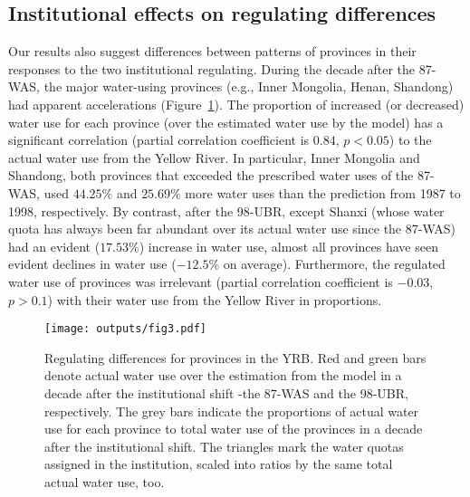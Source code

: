 \subsection{Institutional effects on regulating differences}
\label{result-3}
Our results also suggest differences between patterns of provinces in their responses to the two institutional regulating.
During the decade after the 87-WAS, the major water-using provinces (e.g., Inner Mongolia, Henan, Shandong) had apparent accelerations (Figure~\ref{regulating}).
The proportion of increased (or decreased) water use for each province (over the estimated water use by the model) has a significant correlation (partial correlation coefficient is $0.84$, $p<0.05$) to the actual water use from the Yellow River.
In particular, Inner Mongolia and Shandong, both provinces that exceeded the prescribed water uses of the 87-WAS, used $44.25\%$ and $25.69\%$ more water uses than the prediction from 1987 to 1998, respectively.
By contrast, after the 98-UBR, except Shanxi (whose water quota has always been far abundant over its actual water use since the 87-WAS) had an evident ($17.53\%$) increase in water use, almost all provinces have seen evident declines in water use ($-12.5\%$ on average).
Furthermore, the regulated water use of provinces was irrelevant (partial correlation coefficient is $-0.03$, $p>0.1$) with their water use from the Yellow River in proportions.

\begin{figure*}[!tb]
    \centering
    \texttt{[image: outputs/fig3.pdf]}
    \caption{
        Regulating differences for provinces in the YRB.
        Red and green bars denote actual water use over the estimation from the model in a decade after the institutional shift -the 87-WAS and the 98-UBR, respectively.
        The grey bars indicate the proportions of actual water use for each province to total water use of the provinces in a decade after the institutional shift.
        The triangles mark the water quotas assigned in the institution, scaled into ratios by the same total actual water use, too.
    }
    \label{regulating}
\end{figure*}
